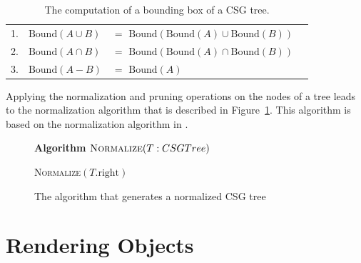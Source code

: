\documentclass[a4paper,10pt,twoside]{report}
\newcommand{\Bound}{\mbox{Bound}}
\begin{document}
    \begin{table}[h]
        \begin{longtable}{llll}
            1. & $\Bound(A \cup B)$ & $=$ $\Bound(\Bound(A) \cup \Bound(B))$\\
            2. & $\Bound(A \cap B)$ & $=$ $\Bound(\Bound(A) \cap \Bound(B))$\\
            3. & $\Bound(A - B)$    & $=$ $\Bound(A)$\\
        \end{longtable}
        \caption{The computation of a bounding box of a CSG tree.}
        \label{table:bounding_box}
    \end{table}

    Applying the normalization and pruning operations on the nodes of a tree leads to the normalization algorithm that is described in  Figure~\ref{figure:algorithm}. This algorithm is based on the normalization algorithm in \cite{Wiegand96}.\\

    \begin{figure}[ht]
            \textbf{Algorithm} $\textsc{Normalize}(T: CSGTree)$\\
            \noindent
            \begin{algorithm}[H]
                \BlankLine
                \BlankLine
                \textsc{Normalize}$(T\mbox{.right})$\;
            \end{algorithm}
        \caption{The algorithm that generates a normalized CSG tree}
        \label{figure:algorithm}
    \end{figure}

\chapter{Rendering Objects}
\end{document}
